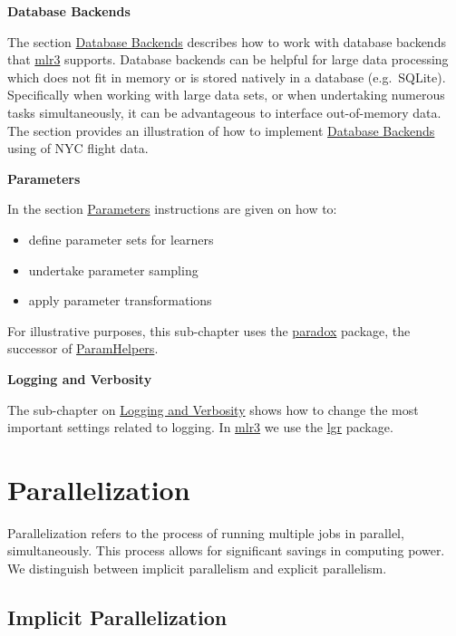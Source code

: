\documentclass[
]{scrbook}
\providecommand{\tightlist}{%
  \setlength{\itemsep}{0pt}\setlength{\parskip}{0pt}}
\begin{document}
\textbf{Database Backends}

The section \protect\hyperlink{backends}{Database Backends} describes how to work with database backends that \href{https://mlr3.mlr-org.com}{mlr3} supports.
Database backends can be helpful for large data processing which does not fit in memory or is stored natively in a database (e.g.~SQLite).
Specifically when working with large data sets, or when undertaking numerous tasks simultaneously, it can be advantageous to interface out-of-memory data.
The section provides an illustration of how to implement \protect\hyperlink{backends}{Database Backends} using of NYC flight data.

\textbf{Parameters}

In the section \protect\hyperlink{paradox}{Parameters} instructions are given on how to:

\begin{itemize}
\tightlist
\item
  define parameter sets for learners
\item
  undertake parameter sampling
\item
  apply parameter transformations
\end{itemize}

For illustrative purposes, this sub-chapter uses the \href{https://paradox.mlr-org.com}{paradox} package, the successor of \href{https://cran.r-project.org/package=ParamHelpers}{ParamHelpers}.

\textbf{Logging and Verbosity}

The sub-chapter on \protect\hyperlink{logging}{Logging and Verbosity} shows how to change the most important settings related to logging.
In \href{https://mlr3.mlr-org.com}{mlr3} we use the \href{https://cran.r-project.org/package=lgr}{lgr} package.

\hypertarget{parallelization}{%
\section{Parallelization}\label{parallelization}}

Parallelization refers to the process of running multiple jobs in parallel, simultaneously.
This process allows for significant savings in computing power.
We distinguish between implicit parallelism and explicit parallelism.

\hypertarget{implicit-parallelization}{%
\subsection{Implicit Parallelization}\label{implicit-parallelization}}
\end{document}

